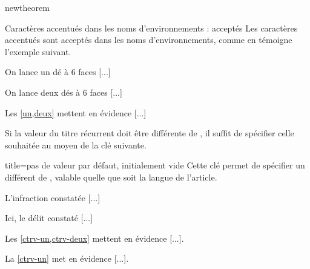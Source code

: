 \documentclass[french,nolocaltoc]{nwejmart}
\newtheorem[style=definition]{fait}
\newtheorem{expérience}
\newtheorem[title=contraventionnalisation]{ctrv}
\newtheorem[title-plural=anneaux]{anneau}
\newtheorem[title-plural=idéaux]{idéal}
\begin{document}
\begin{docCommand}{newtheorem}{}
  \begin{dbremark}{Caractères accentués dans les noms d'environnements :
      acceptés}{}
    Les caractères accentués sont acceptés dans les noms d'environnements, comme
    en témoigne l'exemple suivant.
  \end{dbremark}

\begin{bodycode}[listing and text,listing options={deletekeywords={[2]label}}]
\begin{expérience}\label{un}
  On lance un dé à 6 faces [...]
\end{expérience}
\begin{expérience}\label{deux}
  On lance deux dés à 6 faces [...]
\end{expérience}
Les \vref{un,deux} mettent en évidence [...]
\end{bodycode}

  Si la valeur du titre récurrent doit être différente de , il suffit
  de spécifier celle souhaitée au moyen de la clé  suivante.
  \begin{docKey}{title}{={}}{pas de
      valeur par défaut, initialement vide}
    Cette clé permet de spécifier un  différent de
    , valable quelle que soit la langue de l'article.
  \end{docKey}

\begin{bodycode}[listing and text,listing options={deletekeywords={[2]label}}]
\begin{ctrv}\label{ctrv-un}
  L'infraction constatée [...]
\end{ctrv}
\begin{ctrv}\label{ctrv-deux}
  Ici, le délit constaté [...]
\end{ctrv}
Les \vref{ctrv-un,ctrv-deux} mettent en évidence [...].

La \vref{ctrv-un} met en évidence [...].
\end{bodycode}

\end{docCommand}
\end{document}

